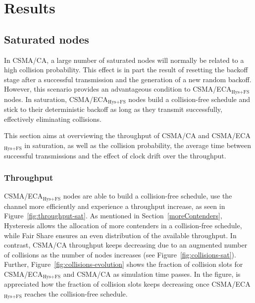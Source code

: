\section{Results}\label{results}

	\subsection{Saturated nodes}\label{resultsSaturated}
	In CSMA/CA, a large number of saturated nodes will normally be related to a high collision probability. This effect is in part the result of resetting the backoff stage after a successful transmission and the generation of a new random backoff. However, this scenario provides an advantageous condition to CSMA/ECA$_{\text{Hys+FS}}$ nodes. In saturation, CSMA/ECA$_{\text{Hys+FS}}$ nodes build a collision-free schedule and stick to their deterministic backoff as long as they transmit successfully, effectively eliminating collisions.
	
	This section aims at overviewing the throughput of CSMA/CA and CSMA/ECA$_{\text{Hys+FS}}$ in saturation, as well as the collision probability, the average time between successful transmissions and the effect of clock drift over the throughput.
	\\
	\subsubsection{Throughput}
	CSMA/ECA$_{\text{Hys+FS}}$ nodes are able to build a collision-free schedule, use the channel more efficiently and experience a throughput increase, as seen in Figure~\ref{fig:throughput-sat}. As mentioned in Section~\ref{moreContenders}, Hysteresis allows the allocation of more contenders in a collision-free schedule, while Fair Share ensures an even distribution of the available throughput. In contrast, CSMA/CA throughput keeps decreasing due to an augmented number of collisions as the number of nodes increases (see Figure~\ref{fig:collisions-sat}). Further, Figure~\ref{fig:collisions-evolution} shows the fraction of collision slots for CSMA/ECA$_{\text{Hys+FS}}$ and CSMA/CA as simulation time passes. In the figure, is appreciated how the fraction of collision slots keeps decreasing once CSMA/ECA$_{\text{Hys+FS}}$ reaches the collision-free schedule.
	
